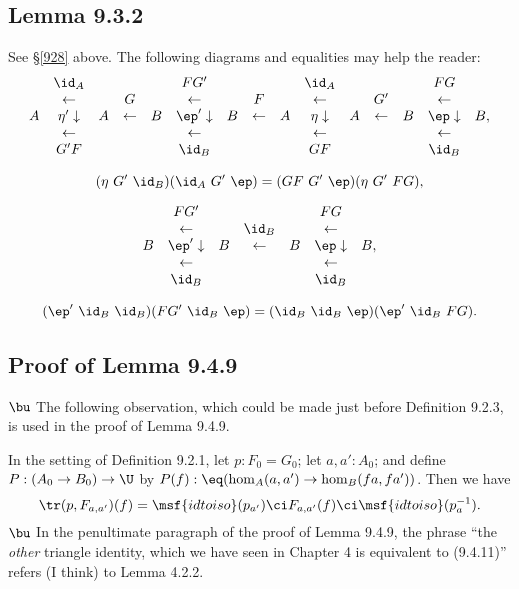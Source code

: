 \documentclass[12pt]{article}
\begin{document}

\subsection{Lemma 9.3.2}

See \S\ref{928} above. The following diagrams and equalities may help the reader:
$$
\begin{array}{ccccccccccccccc}
&\id_A&&&&FG'&&&&\id_A&&&&FG\\
&\leftarrow&&G&&\leftarrow&&F&&\leftarrow&&G'&&\leftarrow\\
A&\eta'\downarrow&A&\leftarrow&B&\ep'\downarrow&B&\leftarrow&A&\eta\downarrow&A&\leftarrow&B&\ep\downarrow&B,\\
&\leftarrow&&&&\leftarrow&&&&\leftarrow&&&&\leftarrow\\
&G'F&&&&\id_B&&&&GF&&&&\id_B
\end{array}
$$ 

$$
(\eta\ G'\ \id_B)(\id_A\ G'\ \ep)=(GF\ G'\ \ep)(\eta\ G'\ FG),
$$

$$
\begin{array}{ccccccc}
&FG'&&&&FG\\
&\leftarrow&&\id_B&&\leftarrow\\
B&\ep'\downarrow&B&\leftarrow&B&\ep\downarrow&B,\\
&\leftarrow&&&&\leftarrow\\
&\id_B&&&&\id_B
\end{array}
$$

$$
(\ep'\ \id_B\ \id_B)(FG'\ \id_B\ \ep)=(\id_B\ \id_B\ \ep)(\ep'\ \id_B\ FG).
$$


\subsection{Proof of Lemma 9.4.9}

$\bu$ The following observation, which could be made just before Definition 9.2.3, is used in the proof of Lemma 9.4.9.

In the setting of Definition 9.2.1, let $p:F_0=G_0$; let $a,a':A_0$; and define $P:(A_0\to B_0)\to\U$ by $P(f):\eq(\hom_A(a,a')\to\hom_B(fa,fa'))$. Then we have 
$$
\tr(p,F_{a,a'})(f)=\msf{idtoiso}(p_{a'})\ci F_{a,a'}(f)\ci\msf{idtoiso}(p_a^{-1}).
$$ 
$\bu$ In the penultimate paragraph of the proof of Lemma 9.4.9, the phrase ``the \emph{other} triangle identity, which we have seen in Chapter 4 is equivalent to (9.4.11)'' refers (I think) to Lemma 4.2.2.
\end{document}
